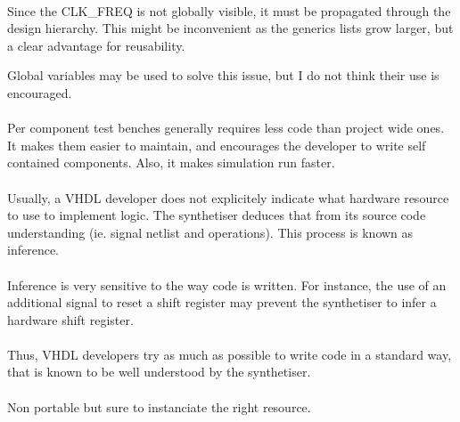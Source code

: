\documentclass[12pt]{article}
\begin{document}
\paragraph{}
Since the CLK\_FREQ is not globally visible, it must be propagated
through the design hierarchy. This might be inconvenient as the generics
lists grow larger, but a clear advantage for reusability.

\todo
{
 Global variables may be used to solve this issue,
 but I do not think their use is encouraged.
}


\paragraph{}
Per component test benches generally requires less code than
project wide ones. It makes them easier to maintain, and
encourages the developer to write self contained components.
Also, it makes simulation run faster.


\paragraph{}
Usually, a VHDL developer does not explicitely indicate what
hardware resource to use to implement logic. The synthetiser
deduces that from its source code understanding (ie. signal
netlist and operations). This process is known as inference.
\paragraph{}
Inference is very sensitive to the way code is written. For
instance, the use of an additional signal to reset a shift
register may prevent the synthetiser to infer a hardware
shift register.
\paragraph{}
Thus, VHDL developers try as much as possible to write code
in a standard way, that is known to be well understood by the
synthetiser.


\paragraph{}
Non portable but sure to instanciate the right resource.


\end{document}
